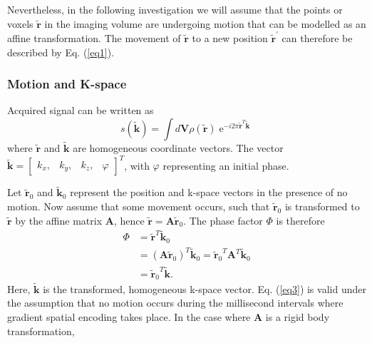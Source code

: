\documentclass[class=article, crop=false]{standalone}
\begin{document}
\par
Nevertheless, in the following investigation we will assume that the points or voxels $\tilde{\textbf{r}}$ in the imaging volume are undergoing motion that can be modelled as an affine transformation. The movement of $\tilde{\textbf{r}}$ to a new position $\tilde{\textbf{r}}^{'}$ can therefore be described by Eq. (\ref{eq1}).

\subsubsection*{Motion and K-space}

Acquired signal can be written as
\begin{equation}
	\label{eq2}
	s(\tilde{\textbf{k}}) = \int d\textbf{V} \rho\left(\tilde{\textbf{r}}\right)\operatorname{e}^{-i2\pi\tilde{\textbf{r}}^{T}\tilde{\textbf{k}}}
\end{equation}
where $\tilde{\textbf{r}}$ and $\tilde{\textbf{k}}$ are homogeneous coordinate vectors. The vector $\tilde{\textbf{k}} = \begin{bmatrix}k_{x},&k_{y},&k_{z},&\varphi\end{bmatrix}^{T}$, with $\varphi$ representing an initial phase.
\par
Let $\tilde{\textbf{r}}_0$ and $\tilde{\textbf{k}}_0$ represent the position and k-space vectors in the presence of no motion. Now assume that some movement occurs, such that $\tilde{\textbf{r}}_0$ is transformed to $\tilde{\textbf{r}}$ by the affine matrix \textbf{A}, hence $\tilde{\textbf{r}} = \textbf{A}\tilde{\textbf{r}}_0$. The phase factor $\Phi$ is therefore
\begin{equation} \label{eq3}
	\begin{split}
		\Phi & = \tilde{\textbf{r}}^T\tilde{\textbf{k}}_0 \\ 
			 & = (\textbf{A}\tilde{\textbf{r}}_0)^T\tilde{\textbf{k}}_0
		     = {\tilde{\textbf{r}}_0}^T\textbf{A}^T\tilde{\textbf{k}}_0 \\
		     & = {\tilde{\textbf{r}}_0}^T\tilde{\textbf{k}}.
	\end{split}
\end{equation}
Here, $\tilde{\textbf{k}}$ is the transformed, homogeneous k-space vector.  Eq. (\ref{eq3}) is valid under the assumption that no motion occurs during the millisecond intervals where gradient spatial encoding takes place. In the case where \textbf{A} is a rigid body transformation,
\end{document}
